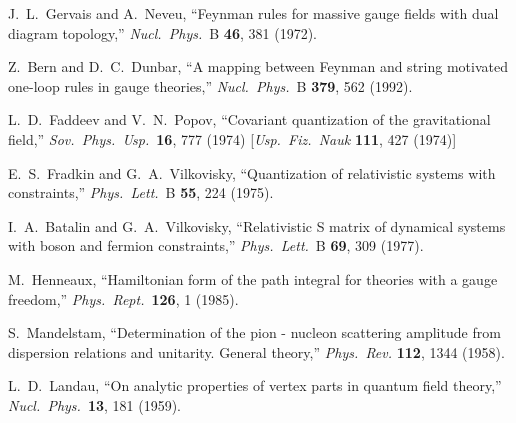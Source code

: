 \begin{thebibliography}{99}
J.~L.~Gervais and A.~Neveu,
``Feynman rules for massive gauge fields with dual diagram topology,''
{\it Nucl.\ Phys.}\ B {\bf 46}, 381 (1972).

Z.~Bern and D.~C.~Dunbar,
``A mapping between Feynman and string motivated one-loop rules in 
gauge theories,''
{\it Nucl.\ Phys.}\ B {\bf 379}, 562 (1992).

L.~D.~Faddeev and V.~N.~Popov,
``Covariant quantization of the gravitational field,''
{\it Sov.\ Phys.\ Usp.}\  {\bf 16}, 777 (1974)
[{\it Usp.\ Fiz.\ Nauk} {\bf 111}, 427 (1974)]

E.~S.~Fradkin and G.~A.~Vilkovisky,
``Quantization of relativistic systems with constraints,''
{\it Phys.\ Lett.}\ B {\bf 55}, 224 (1975).

I.~A.~Batalin and G.~A.~Vilkovisky,
``Relativistic S matrix of dynamical systems with boson and fermion 
constraints,''
{\it Phys.\ Lett.}\ B {\bf 69}, 309 (1977).

M.~Henneaux,
``Hamiltonian form of the path integral for theories with a gauge freedom,''
{\it Phys.\ Rept.}\  {\bf 126}, 1 (1985).

S.~Mandelstam,
``Determination of the pion - nucleon scattering amplitude from dispersion 
relations and unitarity. General theory,''
{\it Phys.\ Rev.}  {\bf 112}, 1344 (1958).

L.~D.~Landau,
``On analytic properties of vertex parts in quantum field theory,''
{\it Nucl.\ Phys.}\  {\bf 13}, 181 (1959).


\end{thebibliography}
